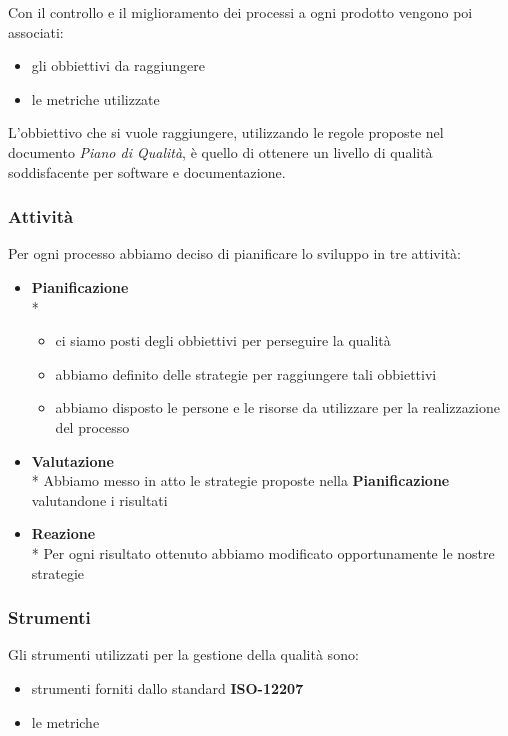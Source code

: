 Con il controllo e il miglioramento dei processi a ogni prodotto vengono poi associati:
\begin{itemize}
	\item gli obbiettivi da raggiungere
	\item le metriche utilizzate
\end{itemize}
L'obbiettivo che si vuole raggiungere, utilizzando le regole proposte nel documento \textit{Piano di Qualità}, è quello di ottenere un livello di qualità soddisfacente per software e documentazione.
\subsubsection{Attività}
Per ogni processo abbiamo deciso di pianificare lo sviluppo in tre attività:
\begin{itemize}
	\item \textbf{Pianificazione} \\*
		\begin{itemize}
			\item ci siamo posti degli obbiettivi per perseguire la qualità
			\item abbiamo definito delle strategie per raggiungere tali obbiettivi
			\item abbiamo disposto le persone e le risorse da utilizzare per la realizzazione del processo
		\end{itemize}
	\item \textbf{Valutazione} \\*
		Abbiamo messo in atto le strategie proposte nella \textbf{Pianificazione} valutandone i risultati
	\item \textbf{Reazione} \\*
		Per ogni risultato ottenuto abbiamo modificato opportunamente le nostre strategie
\end{itemize}
\subsubsection{Strumenti}
Gli strumenti utilizzati per la gestione della qualità sono:
\begin{itemize}
	\item strumenti forniti dallo standard \textbf{ISO-12207}
	\item le metriche
\end{itemize}
